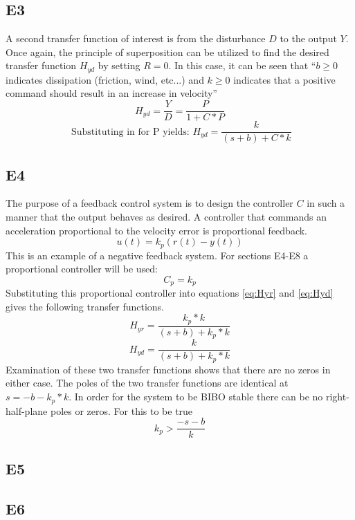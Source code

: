 \documentclass[11pt,titlepage]{article}
\begin{document}
	\subsection*{E3}
		A second transfer function of interest is from the disturbance $D$ to the output $Y$. Once again, the principle of superposition can be utilized to find the desired transfer function $H_{yd}$ by setting $R=0$. In this case, it can be seen that ``$b\geq 0$ indicates dissipation (friction, wind, etc...) and $k\geq 0$ indicates that a positive command should result in an increase in velocity''
		\begin{equation}
			H_{yd}=\frac{Y}{D}=\frac{P}{1+C*P}
		\end{equation}
		\begin{equation} \label{eq:Hyd}
			\mbox{ Substituting in for P yields: } H_{yd}=\frac{k}{(s+b)+C*k}
		\end{equation}

	\subsection*{E4}
		The purpose of a feedback control system is to design the controller $C$ in such a manner that the output behaves as desired. A controller that commands an acceleration proportional to the velocity error is proportional feedback. $$u(t)=k_p(r(t)-y(t))$$ This is an example of a negative feedback system. For sections E4-E8 a proportional controller will be used: $$C_p=k_p$$ Substituting this proportional controller into equations \ref{eq:Hyr} and \ref{eq:Hyd} gives the following transfer functions.
		\begin{equation} \label{eq:propHyr}
			 H_{yr}=\frac{k_p*k}{(s+b)+k_p*k}
		\end{equation}
		\begin{equation} \label{eq:propHyd}
			H_{yd}=\frac{k}{(s+b)+k_p*k}
		\end{equation}
		Examination of these two transfer functions shows that there are no zeros in either case. The poles of the two transfer functions are identical at $s=-b-k_p*k$. In order for the system to be BIBO stable there can be no right-half-plane poles or zeros. For this to be true $$k_p>\frac{-s-b}{k}$$

	\subsection*{E5}
			

	\subsection*{E6}
\end{document}
